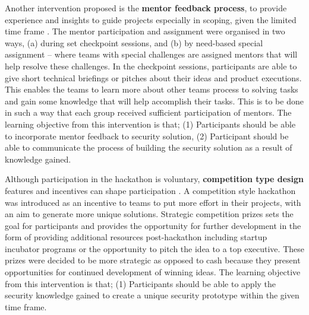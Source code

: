 \documentclass[runningheads]{llncs}
\begin{document}
Another intervention proposed is the \textbf{mentor feedback process}, to provide experience and insights to guide projects especially in scoping, given the limited time frame \cite{lara2016hackathons}. The mentor participation and assignment were organised in two ways, (a) during set checkpoint sessions, and (b) by need-based special assignment -- where teams with special challenges are assigned mentors that will help resolve these challenges. In the checkpoint sessions, participants are able to give short technical briefings or pitches about their ideas and product executions. This enables the teams to learn more about other teams process to solving tasks and gain some knowledge that will help accomplish their tasks. This is to be done in such a way that each group received sufficient participation of mentors. The learning objective from this intervention is that; (1) Participants should be able to incorporate mentor feedback to security solution, (2) Participant should be able to communicate the process of building the security solution as a result of knowledge gained.

Although participation in the hackathon is voluntary, \textbf{competition type design} features and incentives can shape participation \cite{grimes2008robotics}. A competition style hackathon was introduced as an incentive to teams to put more effort in their projects, with an aim to generate more unique solutions. Strategic competition prizes sets the goal for participants and provides the opportunity for further development in the form of providing additional resources post-hackathon including  startup incubator programs or the opportunity to pitch the idea to a top executive. These prizes were decided to be more strategic as opposed to cash because they present opportunities for continued development of winning ideas. The learning objective from this intervention is that; (1) Participants should be able to apply the security knowledge gained to create a unique security prototype within the given time frame.

\end{document}
